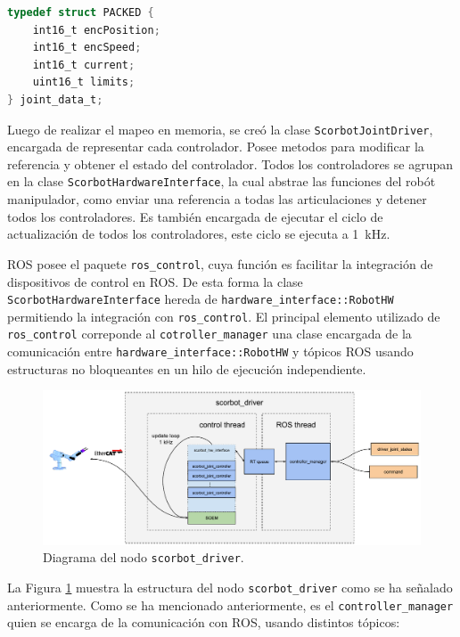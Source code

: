 \begin{description}
\begin{lstlisting}[language=C,style=csstyle, caption=Estructuras de datos usadas para mapear datos de dispositivos esclavos, label=cap4_estructuras]
typedef struct PACKED {
    int16_t encPosition;
    int16_t encSpeed;
    int16_t current;
    uint16_t limits;
} joint_data_t;
\end{lstlisting}

Luego de realizar el mapeo en memoria, se creó la clase \texttt{ScorbotJointDriver}, encargada de representar cada controlador. Posee metodos para modificar la referencia y obtener el estado del controlador. Todos los controladores se agrupan en la clase \texttt{ScorbotHardwareInterface}, la cual abstrae las funciones del robót manipulador, como enviar una referencia a todas las articulaciones y detener todos los controladores. Es también encargada de ejecutar el ciclo de actualización de todos los controladores, este ciclo se ejecuta a \SI{1}{\kilo\hertz}.

ROS posee el paquete \texttt{ros\_control}, cuya función es facilitar la integración de dispositivos de control en ROS. De esta forma la clase \texttt{ScorbotHardwareInterface} hereda de \texttt{hardware\_interface::RobotHW} permitiendo la integración con \texttt{ros\_control}. El principal elemento utilizado de \texttt{ros\_control} correponde al \texttt{cotroller\_manager} una clase encargada de la comunicación entre \texttt{hardware\_interface::RobotHW} y tópicos ROS usando estructuras no bloqueantes en un hilo de ejecución independiente.

\begin{figure}[ht]
  \centering
  \includegraphics[width=\textwidth]{img/cap4/scorbot_driver.pdf}
  \caption{Diagrama del nodo \texttt{scorbot\_driver}.}
  \label{cap4_scorbot_driver}
\end{figure}

La Figura \ref{cap4_scorbot_driver} muestra la estructura del nodo \texttt{scorbot\_driver} como se ha señalado anteriormente. Como se ha mencionado anteriormente, es el \texttt{controller\_manager} quien se encarga de la comunicación con ROS, usando distintos tópicos:

\begin{itemize}


\end{itemize}
\end{description}
